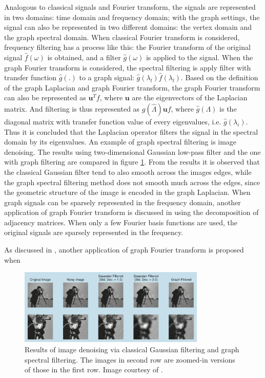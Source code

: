 \documentclass[conference]{IEEEtran}
\begin{document}
Analogous to classical signals and Fourier transform, the signals are represented in two domains: time domain and frequency domain; with the graph settings, the signal can also be represented in two different domains: the vertex domain and the graph spectral domain. When classical Fourier transform is considered, frequency filtering has a process like this: the Fourier transform of the original signal $\hat{f}(\omega)$ is obtained, and a filter $\hat{g}(\omega)$ is applied to the signal. When the graph Fourier transform is considered, the spectral filtering is apply filter with transfer function $\hat{g}(.)$ to a graph signal: $\hat{g}(\lambda_l)\hat{f}(\lambda_l)$. Based on the definition of the graph Laplacian and graph Fourier transform, the graph Fourier transform can also be represented as $\mathbf{u}^Tf$, where $\mathbf{u}$ are the eigenvectors of the Laplacian matrix. And filtering is thus represented as $g(\hat{\Lambda})\mathbf{u}f$, where $\hat{g}(\Lambda)$ is the diagonal matrix with transfer function value of every eigenvalues, i.e. $\hat{g}(\lambda_i)$. Thus it is concluded that the Laplacian operator filters the signal in the spectral domain by its eigenvalues. An example of graph spectral filtering is image denoising. The results using two-dimensional Gaussian low-pass filter and the one with graph filtering are compared in figure \ref{3}. From the results it is observed that the classical Gaussian filter tend to also smooth across the images edges, while the graph spectral filtering method does not smooth much across the edges, since the geometric structure of the image is encoded in the graph Laplacian. When graph signals can be sparsely represented in the frequency domain, another application of graph Fourier transform is discussed in \cite{sandryhaila2013discrete2} using the decomposition of adjacency matrices. When only a few Fourier basis functions are used, the original signals are sparsely represented in the frequency.

As discussed in \cite{sandryhaila2013discrete2}, another application of graph Fourier transform is proposed when 
\begin{figure}[htbp]
\centerline{\includegraphics[width=3.5in]{3.png}}
\caption{Results of image denoising via classical Gaussian filtering and graph spectral filtering. The images in second row are zoomed-in versions of those in the first row. Image courtesy of \cite{shuman2013emerging}.}
\label{3}
\end{figure}
\end{document}
